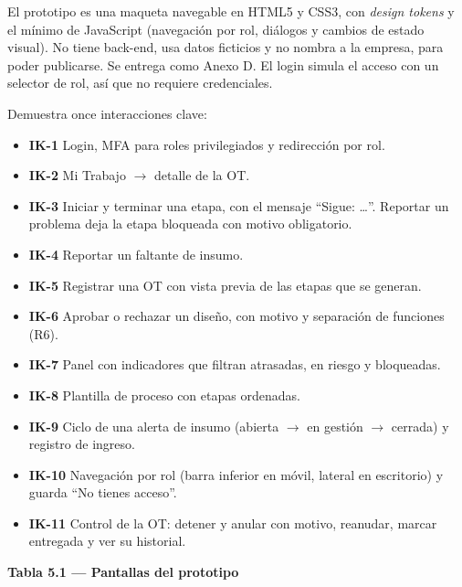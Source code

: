 \documentclass[11pt,a4paper]{article}
\begin{document}
El prototipo es una maqueta navegable en HTML5 y CSS3, con \textit{design tokens} y el mínimo de JavaScript (navegación por rol, diálogos y cambios de estado visual). No tiene back-end, usa datos ficticios y no nombra a la empresa, para poder publicarse. Se entrega como Anexo D. El login simula el acceso con un selector de rol, así que no requiere credenciales.

Demuestra once interacciones clave:

\begin{itemize}
\item \textbf{IK-1} Login, MFA para roles privilegiados y redirección por rol.
\item \textbf{IK-2} Mi Trabajo \ensuremath{\rightarrow}\allowbreak{} detalle de la OT.
\item \textbf{IK-3} Iniciar y terminar una etapa, con el mensaje ``Sigue: \ldots{}''. Reportar un problema deja la etapa bloqueada con motivo obligatorio.
\item \textbf{IK-4} Reportar un faltante de insumo.
\item \textbf{IK-5} Registrar una OT con vista previa de las etapas que se generan.
\item \textbf{IK-6} Aprobar o rechazar un diseño, con motivo y separación de funciones (R6).
\item \textbf{IK-7} Panel con indicadores que filtran atrasadas, en riesgo y bloqueadas.
\item \textbf{IK-8} Plantilla de proceso con etapas ordenadas.
\item \textbf{IK-9} Ciclo de una alerta de insumo (abierta \ensuremath{\rightarrow}\allowbreak{} en gestión \ensuremath{\rightarrow}\allowbreak{} cerrada) y registro de ingreso.
\item \textbf{IK-10} Navegación por rol (barra inferior en móvil, lateral en escritorio) y guarda ``No tienes acceso''.
\item \textbf{IK-11} Control de la OT: detener y anular con motivo, reanudar, marcar entregada y ver su historial.
\end{itemize}

\textbf{Tabla 5.1 --- Pantallas del prototipo}\nopagebreak
\end{document}
